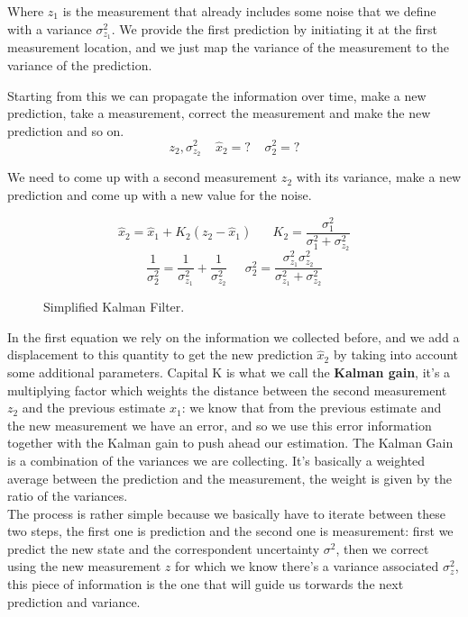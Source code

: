 Where $z_1$ is the measurement that already includes some noise that we define with a variance $\sigma^2_{z_1}$. We provide the first prediction by initiating it at the first measurement location, and we just map the variance of the measurement to the variance of the prediction.

Starting from this we can propagate the information over time, make a new prediction, take a measurement, correct the measurement and make the new prediction and so on.
\[
    z_2, \sigma^2_{z_2}\;\;\;\;\hat{x}_2=?\;\;\;\;\sigma^2_2=?    
\]

We need to come up with a second measurement $z_2$ with its variance, make a new prediction and come up with a new value for the noise.

\begin{figure}[H]    
\[
    \hat{x}_2 = \hat{x}_1 + K_2(z_2-\hat{x}_1) \;\;\;\;\;\; K_2 = \frac{\sigma^2_1}{\sigma^2_1+\sigma^2_{z_2}}  
\]
\[
    \frac{1}{\sigma^2_2} = \frac{1}{\sigma^2_{z_1}}+\frac{1}{\sigma^2_{z_2}}\;\;\;\;\;
    \sigma^2_2 = \frac{\sigma^2_{z_1}\sigma^2_{z_2}}{\sigma^2_{z_1}+\sigma^2_{z_2}} 
\]
\caption{Simplified Kalman Filter.}
\label{eq:kalman}
\end{figure}
In the first equation we rely on the information we collected before, and we add a displacement to this quantity to get the new prediction $\hat{x}_2$ by taking into account some additional parameters. Capital K is what we call the \textbf{Kalman gain}, it's a multiplying factor which weights the distance between the second measurement $z_2$ and the previous estimate $\hat{x}_1$: we know that from the previous estimate and the new measurement we have an error, and so we use this error information together with the Kalman gain to push ahead our estimation. The Kalman Gain is a combination of the variances we are collecting. It's basically a weighted average between the prediction and the measurement, the weight is given by the ratio of the variances. 
\\

The process is rather simple because we basically have to iterate between these two steps, the first one is prediction and the second one is measurement: first we predict the new state and the correspondent uncertainty $\sigma^2$, then we correct using the new measurement $z$ for which we know there's a variance associated $\sigma^2_z$, this piece of information is the one that will guide us torwards the next prediction and variance.
\\

